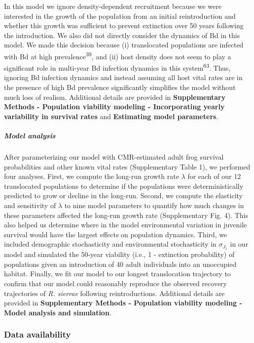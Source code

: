 \documentclass[
  letterpaper,
  DIV=11,
  numbers=noendperiod]{scrartcl}
\let\oldsubparagraph\subparagraph
\renewcommand{\subparagraph}[1]{\oldsubparagraph{#1}\mbox{}}
\begin{document}
In this model we ignore density-dependent recruitment because we were
interested in the growth of the population from an initial
reintroduction and whether this growth was sufficient to prevent
extinction over 50 years following the introduction. We also did not
directly consider the dynamics of Bd in this model. We made this
decision because (i) translocated populations are infected with Bd at
high prevalence\textsuperscript{39}, and (ii) host density does not seem
to play a significant role in multi-year Bd infection dynamics in this
system\textsuperscript{63}. Thus, ignoring Bd infection dynamics and
instead assuming all host vital rates are in the presence of high Bd
prevalence significantly simplifies the model without much loss of
realism. Additional details are provided in \textbf{Supplementary
Methods - Population viability modeling - Incorporating yearly
variability in survival rates} and \textbf{Estimating model parameters}.

\subparagraph{Model analysis}\label{model-analysis}

After parameterizing our model with CMR-estimated adult frog survival
probabilities and other known vital rates (Supplementary Table 1), we
performed four analyses. First, we compute the long-run growth rate
\(\lambda\) for each of our 12 translocated populations to determine if
the populations were deterministically predicted to grow or decline in
the long-run. Second, we compute the elasticity and sensitivity of
\(\lambda\) to nine model parameters to quantify how much changes in
these parameters affected the long-run growth rate (Supplementary Fig.
4). This also helped us determine where in the model environmental
variation in juvenile survival would have the largest effects on
population dynamics. Third, we included demographic stochasticity and
environmental stochasticity in \(\sigma_{J_1}\) in our model and
simulated the 50-year viability (i.e., 1 - extinction probability) of
populations given an introduction of 40 adult individuals into an
unoccupied habitat. Finally, we fit our model to our longest
translocation trajectory to confirm that our model could reasonably
reproduce the observed recovery trajectories of \emph{R. sierrae}
following reintroductions. Additional details are provided in
\textbf{Supplementary Methods - Population viability modeling - Model
analysis and simulation}.

\subsubsection{Data availability}\label{data-availability}
\end{document}

